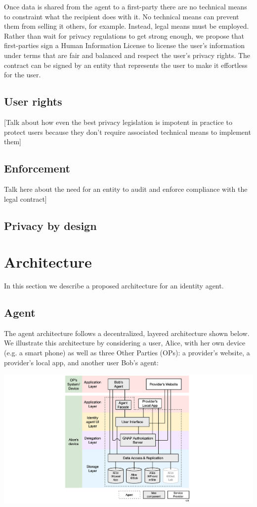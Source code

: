 \documentclass[11pt, oneside]{article}   	%
\begin{document}
Once data is shared from the agent to a first-party there are no technical means to constraint what the recipient does with it. No technical means can prevent them from selling it others, for example. Instead, legal means must be employed. Rather than wait for privacy regulations to get strong enough, we propose that first-parties sign a Human Information License to license the user's information under terms that are fair and balanced and respect the user's privacy rights. The contract can be signed by an entity that represents the user to make it effortless for the user.

\subsection{User rights}

[Talk about how even the best privacy legislation is impotent in practice to protect users because they don't require associated technical means to implement them]

\subsection{Enforcement}

Talk here about the need for an entity to audit and enforce compliance with the legal contract]

\subsection{Privacy by design}

\section{Architecture}
In this section we describe a proposed architecture for an identity agent.

\subsection{Agent}

The agent architecture follows a decentralized, layered architecture shown below. We illustrate this architecture by considering a user, Alice, with her own device (e.g. a smart phone) as well as three Other Parties (OPs): a provider's website, a provider's local app, and another user Bob's agent:

\includegraphics[width=\textwidth]{./images/architecture.png}
\end{document}
